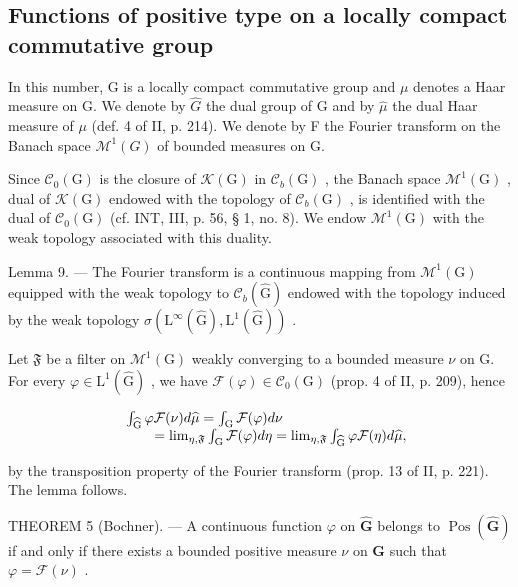 \subsection{Functions of positive type on a locally compact commutative group}

In this number, G is a locally compact commutative group and \(\mu\) denotes a Haar measure on G. We denote by \(\widehat{G}\) the dual group of G and by \(\widehat{\mu}\) the dual Haar measure of \(\mu\) (def. 4 of II, p. 214). We denote by F the Fourier transform on the Banach space \(\mathcal{M}^{1}(G)\) of bounded measures on G.

Since \(\mathcal{C}_0(\mathrm{G})\) is the closure of \(\mathcal{K}(\mathrm{G})\) in \(\mathcal{C}_b(\mathrm{G})\) , the Banach space \(\mathcal{M}^1 (\mathrm{G})\) , dual of \(\mathcal{K}(\mathrm{G})\) endowed with the topology of \(\mathcal{C}_b(\mathrm{G})\) , is identified with the dual of \(\mathcal{C}_0(\mathrm{G})\) (cf. INT, III, p. 56, § 1, no. 8). We endow \(\mathcal{M}^1 (\mathrm{G})\) with the weak topology associated with this duality.

Lemma 9. --- The Fourier transform is a continuous mapping from \(\mathcal{M}^{1}(\mathrm{G})\) equipped with the weak topology to \(\mathcal{C}_{b}(\widehat{\mathrm{G}})\) endowed with the topology induced by the weak topology \(\sigma(\mathrm{L}^{\infty}(\widehat{\mathrm{G}}),\mathrm{L}^{1}(\widehat{\mathrm{G}}))\) .

Let \(\mathfrak{F}\) be a filter on \(\mathcal{M}^1 (\mathrm{G})\) weakly converging to a bounded measure \(\nu\) on G. For every \(\varphi \in \mathrm{L}^1 (\widehat{\mathrm{G}})\) , we have \(\mathcal{F}(\varphi)\in \mathcal{C}_0(\mathrm{G})\) (prop. 4 of II, p. 209), hence

\[
\begin{array}{r l} & {\int_ {\widehat {\mathrm{G}}} \varphi \mathcal {F} (\nu) d \widehat {\mu} = \int_ {\mathrm{G}} \mathcal {F} (\varphi) d \nu} \\ & {\qquad = \lim _ {\eta , \mathfrak {F}} \int_ {\mathrm{G}} \mathcal {F} (\varphi) d \eta = \lim _ {\eta , \mathfrak {F}} \int_ {\widehat {\mathrm{G}}} \varphi \mathcal {F} (\eta) d \widehat {\mu},} \end{array}
\]

by the transposition property of the Fourier transform (prop. 13 of II, p. 221). The lemma follows.

THEOREM 5 (Bochner). --- A continuous function \(\varphi\) on \(\widehat{\mathbf{G}}\) belongs to \(\operatorname{Pos}(\widehat{\mathbf{G}})\) if and only if there exists a bounded positive measure \(\nu\) on \(\mathbf{G}\) such that \(\varphi = \mathcal{F}(\nu)\) .

